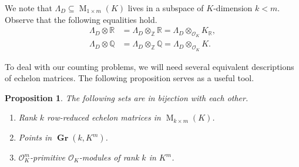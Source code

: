 \documentclass{amsart}
\newtheorem{proposition}[theorem]{Proposition}
\theoremstyle{definition}
\theoremstyle{remark}
\newcommand{\OK}{\mathcal{O}_K}
\DeclareMathOperator{\M}{M}
\DeclareMathOperator{\Gr}{\mathbf{Gr}}
\begin{document}
We note that $\Lambda_{D}\subseteq \M_{1 \times m}(K)$ lives in a subspace of $K$-dimension $k < m$.
Observe that the following equalities hold.
\begin{align}
    \Lambda_D \otimes \mathbb{R} & = \Lambda_D \otimes_{\mathbb{Z}} \mathbb{R} = \Lambda_D \otimes _{\OK} K_{\mathbb{R}},\\
    \Lambda_D \otimes \mathbb{Q} & = \Lambda_D \otimes_{\mathbb{Z}} \mathbb{Q}  = \Lambda_D \otimes_{\OK } K .
\end{align}

To deal with our counting problems, we will need several equivalent descriptions of echelon matrices. The following proposition serves as a useful tool.
\begin{proposition}
    \label{pr:trijection}
    The following sets are in bijection with each other.
    \begin{enumerate}
        \item Rank $k$ row-reduced echelon matrices in $\M_{k \times m}(K)$.
        \item Points in $\Gr(k,K^{m})$.
        \item $\OK^{m}$-primitive $\OK$-modules of rank $k$ in $K^{m}$.
    \end{enumerate}
\end{proposition}
\end{document}
